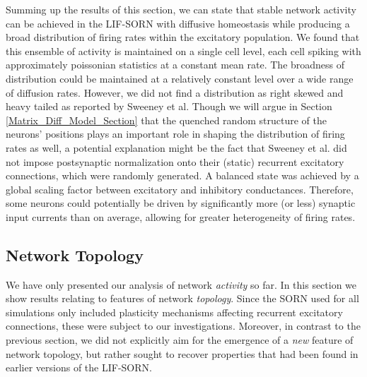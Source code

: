\documentclass[10pt,a4paper]{article}
\begin{document}
Summing up the results of this section, we can state that stable network activity can be achieved in the LIF-SORN with diffusive homeostasis while producing a broad distribution of firing rates within the excitatory population. We found that this ensemble of activity is maintained on a single cell level, each cell spiking with approximately poissonian statistics at a constant mean rate. The broadness of distribution could be maintained at a relatively constant level over a wide range of diffusion rates. However, we did not find a distribution as right skewed and heavy tailed as reported by Sweeney et al. Though we will argue in Section \ref{Matrix_Diff_Model_Section} that the quenched random structure of the neurons' positions plays an important role in shaping the distribution of firing rates as well, a potential explanation might be the fact that Sweeney et al. did not impose postsynaptic normalization onto their (static) recurrent excitatory connections, which were randomly generated. A balanced state was achieved by a global scaling factor between excitatory and inhibitory conductances. Therefore, some neurons could potentially be driven by significantly more (or less) synaptic input currents than on average, allowing for greater heterogeneity of firing rates.

\subsection{Network Topology}\label{Network_Topology_Section}
We have only presented our analysis of network \emph{activity} so far. In this section we show results relating to features of network \emph{topology}. Since the SORN used for all simulations only included plasticity mechanisms affecting recurrent excitatory connections, these were subject to our investigations. Moreover, in contrast to the previous section, we did not explicitly aim for the emergence of a \emph{new} feature of network topology, but rather sought to recover properties that had been found in earlier versions of the LIF-SORN.
\end{document}
